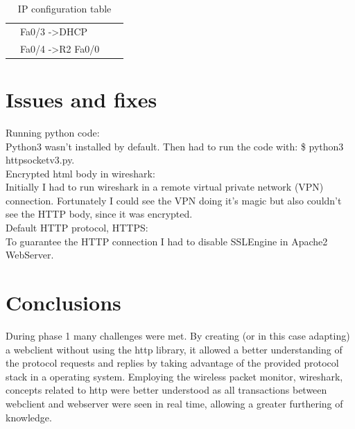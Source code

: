 \documentclass[11pt,a4paper]{report}
\begin{document}
\begin{table}[]
\begin{center}
\begin{tabular}{@{}llllll@{}}
                                                   & Fa0/3 -\textgreater   DHCP                               &                                                       & \multicolumn{3}{c}{}                                                                                                                                                 \\ \cmidrule(lr){2-2}
                                                   & Fa0/4 -\textgreater R2   Fa0/0                           &                                                       & \multicolumn{3}{c}{}                                                                                                                                                 \\ \bottomrule
\end{tabular}
\caption{IP configuration table}
\label{tab:deviceiptable}
\end{center}
\end{table}

\chapter{Issues and fixes}
    Running python code: \\
        \hspace*{10mm}Python3 wasn't installed by default. Then had to run the code with: \$ python3 httpsocketv3.py. \\
    Encrypted html body in wireshark: \\
        \hspace*{10mm}Initially I had to run wireshark in a remote virtual private network (VPN) connection. Fortunately I could see the VPN doing it's magic but also couldn't see the HTTP body, since it was encrypted. \\
    Default HTTP protocol, HTTPS: \\
        \hspace*{10mm}To guarantee the HTTP connection I had to disable SSLEngine in Apache2 WebServer. \\

\chapter{Conclusions}
During phase 1 many challenges were met.
By creating (or in this case adapting) a webclient without using the http library, it allowed a better understanding of the protocol requests and replies by taking advantage of the provided protocol stack in a operating system.
Employing the wireless packet monitor, wireshark, concepts related to http were better understood as all transactions between webclient and webserver were seen in real time, allowing a greater furthering of knowledge.
\end{document}
